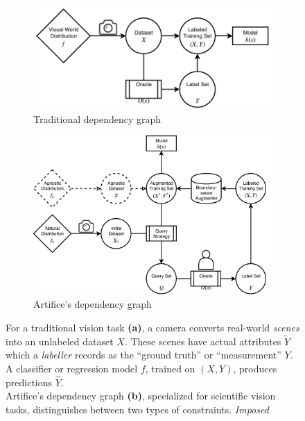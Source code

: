 \documentclass[twocolumn, 10pt]{asme2ej} %
\begin{document}
\begin{figure}
  \centering
  \begin{subfigure}{0.4\linewidth}
    \includegraphics[width=\columnwidth]{traditional_graph}
    \caption{Traditional dependency graph}
    \label{fig:traditional-graph}
  \end{subfigure}
  \hspace{0.1\linewidth}
  \begin{subfigure}{0.4\linewidth}
    \includegraphics[width=\columnwidth]{artifice_graph}
    \caption{Artifice's dependency graph}
    \label{fig:artifice-graph}
  \end{subfigure}
  \caption{For a traditional vision task \textbf{(a)}, a camera converts
    real-world \textit{scenes} into an unlabeled dataset $X$. These scenes have
    actual attributes $\tilde{Y}$ which a \textit{labeller} records as the
    ``ground truth'' or ``measurement'' $Y$. A classifier or regression model
    $f$, trained on $(X,Y)$, produces predictions $\hat{Y}$.\\
    Artifice's dependency graph \textbf{(b)}, specialized for scientific vision
    tasks, distinguishes between two types of constraints. \textit{Imposed
}}
\end{figure}
\end{document}

